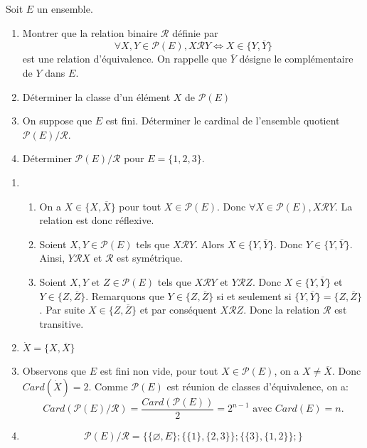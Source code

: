 \begin{exercise}[from=Devoir MPI 2010]
Soit $E$ un ensemble.
\begin{enumerate}
    \item Montrer que la relation binaire $\mathcal{R}$ définie par
    \begin{equation*}
        \forall X, Y \in \mathcal{P}(E), X \mathcal{R}Y \Longleftrightarrow X \in \{Y, \overline{Y}\}
    \end{equation*}
    est une relation d'équivalence. On rappelle que $\overline{Y}$ désigne le complémentaire de $Y$ dans $E$.
    \item Déterminer la classe d'un élément $X$ de $\mathcal{P}(E)$
    \item On suppose que $E$ est fini. Déterminer le cardinal de l'ensemble quotient $\mathcal{P}(E)/\mathcal{R}$.
    \item Déterminer $\mathcal{P}(E)/\mathcal{R}$ pour $E=\{1,2,3\}$.
\end{enumerate}

\cor

\begin{enumerate}
    \item \begin{enumerate}
        \item On a $X \in \{X, \overline{X}\}$ pour tout $X \in \mathcal{P}(E)$. Donc $\forall X \in \mathcal{P}(E), X\mathcal{R}Y$. La relation est donc réflexive.
        \item Soient $X,Y \in \mathcal{P}(E)$ tels que $X\mathcal{R}Y$. Alors $X \in \{Y, \overline{Y}\}$. Donc $Y \in \{Y, \overline{Y}\}$. Ainsi, $Y\mathcal{R}X$ et $\mathcal{R}$ est symétrique.
        \item Soient $X,Y \text{ et } Z \in \mathcal{P}(E)$ tels que $X\mathcal{R}Y \text{ et } Y\mathcal{R} Z$. Donc $X \in \{Y, \overline{Y}\}$ et $Y \in \{Z, \overline{Z}\}$. Remarquons que $Y \in \{Z, \overline{Z}\}$ si et seulement si $\{Y, \overline{Y}\} =\{Z, \overline{Z}\}$. Par suite $X \in \{Z, \overline{Z}\}$ et par conséquent $X\mathcal{R}Z$. Donc la relation $\mathcal{R}$ est transitive.
    \end{enumerate}
    \item $\dot{X}=\{X, \overline{X}\}$
    \item Observons que $E$ est fini non vide, pour tout $X \in \mathcal{P}(E)$, on a $X \neq \overline{X}$. Donc $Card(\dot{X})=2$. Comme $\mathcal{P}(E)$ est réunion de classes d'équivalence, on a:
    \begin{equation*}
        Card(\mathcal{P}(E)/\mathcal{R})=\frac{Card(\mathcal{P}(E))}{2}= 2^{n-1} \text{ avec } Card(E)=n.
    \end{equation*}
    \item \begin{equation*}
        \mathcal{P}(E)/\mathcal{R} = \Big\{\big\{\varnothing, E\big\}; \big\{\{1\}, \{2, 3\}\big\}; \big\{\{3\}, \{1, 2\}\big\};\Big\}
    \end{equation*}
\end{enumerate}

\end{exercise}

